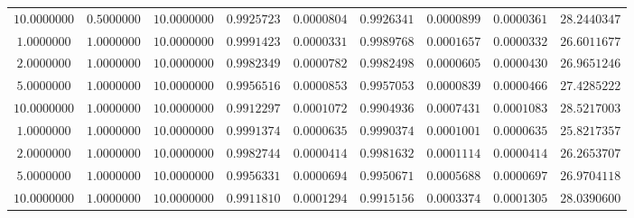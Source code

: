\begin{tabular}{ccccccccc}
$10.0000000$ & $0.5000000$ & $10.0000000$ & $0.9925723$ & $0.0000804$ & $0.9926341$ & $0.0000899$ & $0.0000361$ & $28.2440347$\\
$1.0000000$ & $1.0000000$ & $10.0000000$ & $0.9991423$ & $0.0000331$ & $0.9989768$ & $0.0001657$ & $0.0000332$ & $26.6011677$\\
$2.0000000$ & $1.0000000$ & $10.0000000$ & $0.9982349$ & $0.0000782$ & $0.9982498$ & $0.0000605$ & $0.0000430$ & $26.9651246$\\
$5.0000000$ & $1.0000000$ & $10.0000000$ & $0.9956516$ & $0.0000853$ & $0.9957053$ & $0.0000839$ & $0.0000466$ & $27.4285222$\\
$10.0000000$ & $1.0000000$ & $10.0000000$ & $0.9912297$ & $0.0001072$ & $0.9904936$ & $0.0007431$ & $0.0001083$ & $28.5217003$\\
$1.0000000$ & $1.0000000$ & $10.0000000$ & $0.9991374$ & $0.0000635$ & $0.9990374$ & $0.0001001$ & $0.0000635$ & $25.8217357$\\
$2.0000000$ & $1.0000000$ & $10.0000000$ & $0.9982744$ & $0.0000414$ & $0.9981632$ & $0.0001114$ & $0.0000414$ & $26.2653707$\\
$5.0000000$ & $1.0000000$ & $10.0000000$ & $0.9956331$ & $0.0000694$ & $0.9950671$ & $0.0005688$ & $0.0000697$ & $26.9704118$\\
$10.0000000$ & $1.0000000$ & $10.0000000$ & $0.9911810$ & $0.0001294$ & $0.9915156$ & $0.0003374$ & $0.0001305$ & $28.0390600$\\
\end{tabular}

